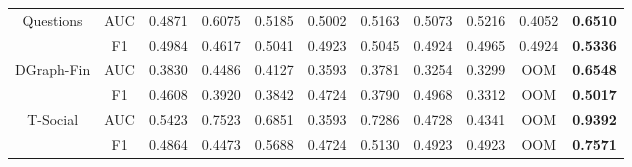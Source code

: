 \begin{table}[t]
{\begin{tabular}{cc|ccccccccc}
\multirow{2}{*}{Questions}  & AUC     & 0.4871 & 0.6075 & 0.5185 & 0.5002 & 0.5163 & 0.5073 & 0.5216 & 0.4052 & \textbf{0.6510} \\
                            & F1      & 0.4984 & 0.4617 & 0.5041 & 0.4923 & 0.5045 & 0.4924 & 0.4965 & 0.4924 & \textbf{0.5336} \\ \hline
\multirow{2}{*}{DGraph-Fin} & AUC     & 0.3830 & 0.4486 & 0.4127 & 0.3593 & 0.3781 & 0.3254 & 0.3299 & OOM    & \textbf{0.6548} \\
                            & F1      & 0.4608 & 0.3920 & 0.3842 & 0.4724 & 0.3790 & 0.4968 & 0.3312 & OOM    & \textbf{0.5017} \\ \hline
\multirow{2}{*}{T-Social}   & AUC     & 0.5423 & 0.7523 & 0.6851 & 0.3593 & 0.7286 & 0.4728 & 0.4341 & OOM    & \textbf{0.9392} \\
                            & F1      & 0.4864 & 0.4473 & 0.5688 & 0.4724 & 0.5130 & 0.4923 & 0.4923 & OOM    & \textbf{0.7571} \\ \hline \hline
\end{tabular}
}\vspace{-4mm}
\end{table}

